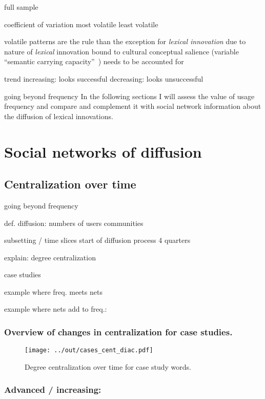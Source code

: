 \documentclass[draft, a4paper, abstract=on]{scrartcl}
\begin{document}
  full sample

  coefficient of variation
  most volatile
  least volatile

  volatile patterns are the rule than the exception for \emph{lexical innovation}
  due to nature of \emph{lexical} innovation
  bound to cultural conceptual salience (variable \enquote{semantic carrying capacity}~\parencite{Nini2017ApplicationGrowth})
  needs to be accounted for

  trend
  increasing: looks successful
  decreasing: looks unsuccessful

  going beyond frequency
  In the following sections I will assess the value of usage frequency and compare and complement it with social network information about the diffusion of lexical innovations.

  \section{Social networks of diffusion}

    \subsection{Centralization over time}

  going beyond frequency

  def. diffusion:
  numbers of users
  communities

  subsetting / time slices
  start of diffusion process
  4 quarters

  explain: degree centralization

  case studies

  example where freq. meets nets

  example where nets add to freq.: 

      \subsubsection{Overview of changes in centralization for case studies.}

  \begin{figure}[H]
  \caption{Degree centralization over time for case study words.}
  \centering
  \texttt{[image: ../out/cases\_cent\_diac.pdf]}
  \end{figure}

      \subsubsection{Advanced / increasing: }
\end{document}
